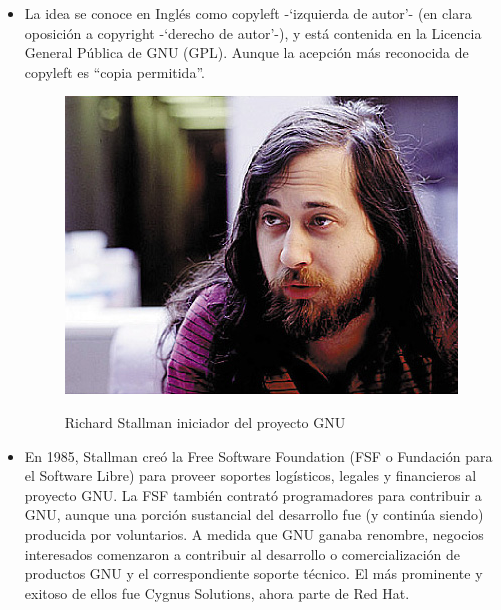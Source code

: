 \documentclass{beamer}
\begin{document}
\begin{frame}
\begin{itemize}
\item La idea se conoce en Inglés como copyleft -`izquierda de autor'- (en clara oposición a copyright -`derecho de autor'-), y está contenida en la Licencia General Pública de GNU (GPL). Aunque la acepción más reconocida de copyleft es ``copia permitida''.
\begin{figure}
  \begin{center}
    \includegraphics[scale=0.35]{Images/Richard_Matthew_Stallman.jpeg}
    \label{fig:richard}
    \caption{Richard Stallman iniciador del proyecto GNU}
  \end{center}
\end{figure}

\end{itemize}
\end{frame}

\begin{frame}
  \begin{itemize}
  \item En 1985, Stallman creó la Free Software Foundation (FSF o Fundación para el Software Libre) para proveer soportes logísticos, legales y financieros al proyecto GNU. La FSF también contrató programadores para contribuir a GNU, aunque una porción sustancial del desarrollo fue (y continúa siendo) producida por voluntarios. A medida que GNU ganaba renombre, negocios interesados comenzaron a contribuir al desarrollo o comercialización de productos GNU y el correspondiente soporte técnico. El más prominente y exitoso de ellos fue Cygnus Solutions, ahora parte de Red Hat.
    \end{itemize}
 \end{frame}
 
\end{document}
